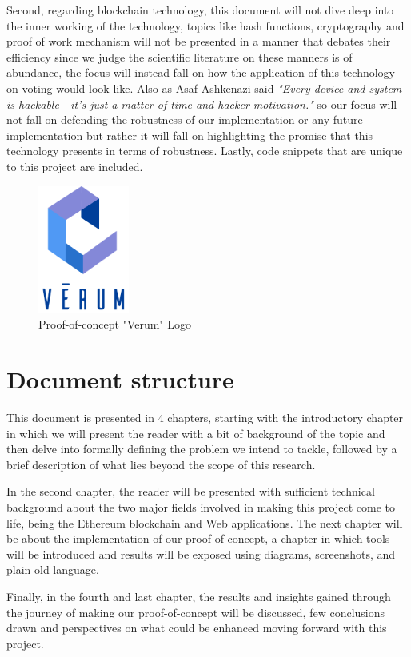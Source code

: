 Second, regarding blockchain technology, this document will not dive deep into the inner working of the technology, topics like hash functions, cryptography and proof of work mechanism will not be presented in a manner that debates their efficiency since we judge the scientific literature on these manners is of abundance, the focus will instead fall on how the application of this technology on voting would look like. Also as Asaf Ashkenazi said \textit{"Every device and system is hackable—it’s just a matter of time and hacker motivation."}\cite{CybersecurityExpertWarns} so our focus will not fall on defending the robustness of our implementation or any future implementation but rather it will fall on highlighting the promise that this technology presents in terms of robustness.
Lastly, code snippets that are unique to this project are included.

\begin{figure}[h]
	\centering
		\includegraphics[width=3cm]{images/chapter1/verum.png}
		\caption{{\footnotesize Proof-of-concept "Verum" Logo}}
\end{figure}

\section{Document structure}
This document is presented in 4 chapters, starting with the introductory chapter in which we will present the reader with a bit of background of the topic and then delve into formally defining the problem we intend to tackle, followed by a brief description of what lies beyond the scope of this research.

In the second chapter, the reader will be presented with sufficient technical background about the two major fields involved in making this project come to life, being the Ethereum blockchain and Web applications. The next chapter will be about the implementation of our proof-of-concept, a chapter in which tools will be introduced and results will be exposed using diagrams, screenshots, and plain old language.

Finally, in the fourth and last chapter, the results and insights gained through the journey of making our proof-of-concept will be discussed, few conclusions drawn and perspectives on what could be enhanced moving forward with this project.

